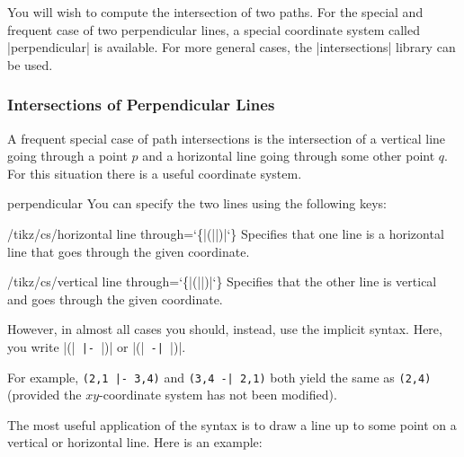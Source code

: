 You will wish to compute the intersection of two paths. For the special and
frequent case of two perpendicular lines, a special coordinate system called
|perpendicular| is available. For more general cases, the |intersections|
library can be used.


\subsubsection{Intersections of Perpendicular Lines}

A frequent special case of path intersections is the intersection of a vertical
line going through a point $p$ and a horizontal line going through some other
point $q$. For this situation there is a useful coordinate system.

\begin{coordinatesystem}{perpendicular}
    You can specify the two lines using the following keys:

    \begin{key}{/tikz/cs/horizontal line through={\ttfamily\char`\{}|(||)|{\ttfamily\char`\}}}
        Specifies that one line is a horizontal line that goes through the
        given coordinate.
    \end{key}
    \begin{key}{/tikz/cs/vertical line through={\ttfamily\char`\{}|(||)|{\ttfamily\char`\}}}
        Specifies that the other line is vertical and goes through the given
        coordinate.
    \end{key}

    However, in almost all cases you should, instead, use the implicit syntax.
    Here, you write 
    |(|\verb! |- !|)| or
    |(|\verb! -| !|)|.

    For example, \verb!(2,1 |- 3,4)! and  \verb!(3,4 -| 2,1)! both yield the
    same as \verb!(2,4)! (provided the $xy$-co\-or\-di\-nate system has not
    been modified).

    The most useful application of the syntax is to draw a line up to some
    point on a vertical or horizontal line. Here is an example:
\begin{codeexample}[]
\end{codeexample}
\end{coordinatesystem}

